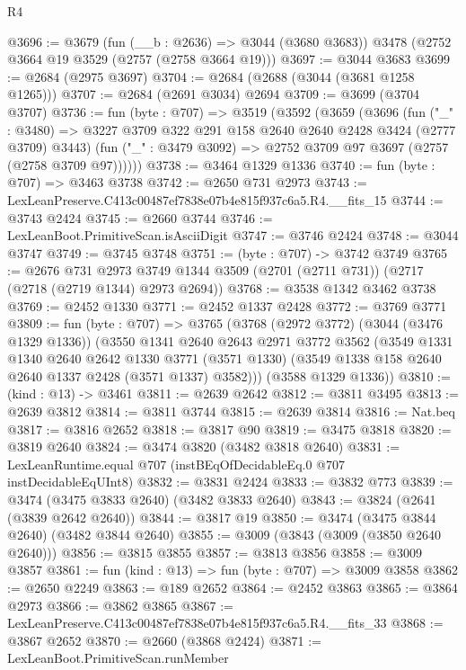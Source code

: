 \begin{lexlean}{R4}
\begin{coremodule}
@3696 := @3679
    (fun (__b : @2636) => @3044 (@3680 @3683))
    @3478
    (@2752 @3664 @19 @3529 (@2757 (@2758 @3664 @19)))
@3697 := @3044 @3683
@3699 := @2684 (@2975 @3697)
@3704 := @2684 (@2688 (@3044 (@3681 @1258 @1265)))
@3707 := @2684 (@2691 @3034) @2694
@3709 := @3699 (@3704 @3707)
@3736 := fun (byte : @707) =>
  @3519
    (@3592
      (@3659
        (@3696
          (fun ("_" : @3480) =>
          @3227 @3709 @322 @291 @158 @2640 @2640 @2428 @3424 (@2777 @3709) @3443)
          (fun ("_" : @3479 @3092) => @2752 @3709 @97 @3697 (@2757 (@2758 @3709 @97))))))
@3738 := @3464 @1329 @1336
@3740 := fun (byte : @707) => @3463 @3738
@3742 := @2650 @731 @2973
@3743 := LexLeanPreserve.C413c00487ef7838e07b4e815f937c6a5.R4.__fits_15
@3744 := @3743 @2424
@3745 := @2660 @3744
@3746 := LexLeanBoot.PrimitiveScan.isAsciiDigit
@3747 := @3746 @2424
@3748 := @3044 @3747
@3749 := @3745 @3748
@3751 := (byte : @707) -> @3742 @3749
@3765 := @2676
    @731
    @2973
    @3749
    @1344
    @3509
    (@2701 (@2711 @731))
    (@2717 (@2718 (@2719 @1344) @2973 @2694))
@3768 := @3538 @1342 @3462 @3738
@3769 := @2452 @1330
@3771 := @2452 @1337 @2428
@3772 := @3769 @3771
@3809 := fun (byte : @707) =>
  @3765
    (@3768
      (@2972 @3772)
      (@3044 (@3476 @1329 @1336))
      (@3550
        @1341
        @2640
        @2643
        @2971
        @3772
        @3562
        (@3549
          @1331
          @1340
          @2640
          @2642
          @1330
          @3771
          (@3571 @1330)
          (@3549 @1338 @158 @2640 @2640 @1337 @2428 (@3571 @1337) @3582)))
      (@3588 @1329 @1336))
@3810 := (kind : @13) -> @3461
@3811 := @2639 @2642
@3812 := @3811 @3495
@3813 := @2639 @3812
@3814 := @3811 @3744
@3815 := @2639 @3814
@3816 := Nat.beq
@3817 := @3816 @2652
@3818 := @3817 @90
@3819 := @3475 @3818
@3820 := @3819 @2640
@3824 := @3474 @3820 (@3482 @3818 @2640)
@3831 := LexLeanRuntime.equal @707 (instBEqOfDecidableEq.{0} @707 instDecidableEqUInt8)
@3832 := @3831 @2424
@3833 := @3832 @773
@3839 := @3474 (@3475 @3833 @2640) (@3482 @3833 @2640)
@3843 := @3824 (@2641 (@3839 @2642 @2640))
@3844 := @3817 @19
@3850 := @3474 (@3475 @3844 @2640) (@3482 @3844 @2640)
@3855 := @3009 (@3843 (@3009 (@3850 @2640 @2640)))
@3856 := @3815 @3855
@3857 := @3813 @3856
@3858 := @3009 @3857
@3861 := fun (kind : @13) => fun (byte : @707) => @3009 @3858
@3862 := @2650 @2249
@3863 := @189 @2652
@3864 := @2452 @3863
@3865 := @3864 @2973
@3866 := @3862 @3865
@3867 := LexLeanPreserve.C413c00487ef7838e07b4e815f937c6a5.R4.__fits_33
@3868 := @3867 @2652
@3870 := @2660 (@3868 @2424)
@3871 := LexLeanBoot.PrimitiveScan.runMember

\end{coremodule}
\end{lexlean}
